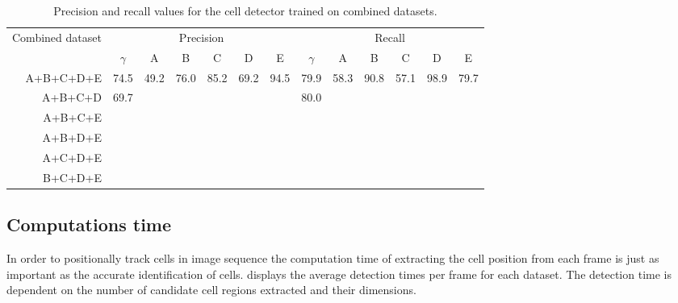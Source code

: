 		\begin{table}[h]
			\centering
			\begin{tabular}{r|*{6}{c}|*{6}{c}}
				\multicolumn{1}{c}{Combined dataset} & \multicolumn{6}{|c|}{Precision}             &         \multicolumn{6}{c}{Recall}          \\
				                                     & $\gamma$ &  A   &  B   &  C   &  D   &  E   & $\gamma$ &  A   &  B   &  C   &  D   &  E   \\
			\hline
				                           A+B+C+D+E &   74.5   & 49.2 & 76.0 & 85.2 & 69.2 & 94.5 &   79.9   & 58.3 & 90.8 & 57.1 & 98.9 & 79.7 \\
				                             A+B+C+D &   69.7    &      &      &      &      &      &  80.0    &      &      &      &      &  \\
				                             A+B+C+E &          &      &      &      &      &      &          &      &      &      &      &  \\
				                             A+B+D+E &          &      &      &      &      &      &          &      &      &      &      &  \\
				                             A+C+D+E &          &      &      &      &      &      &          &      &      &      &      &  \\
				                             B+C+D+E &          &      &      &      &      &      &          &      &      &      &      &
			\end{tabular} 
			\caption{Precision and recall values for the cell detector trained on combined datasets.}
			\label{tab:results_detector_combined}
		\end{table}
				

	\subsection{Computations time \statusnew}
	
		In order to positionally track cells in image sequence the computation time of extracting the cell position from each frame is just as important as the accurate identification of cells.  displays the average detection times per frame for each dataset. The detection time is dependent on the number of candidate cell regions extracted and their dimensions.
		
